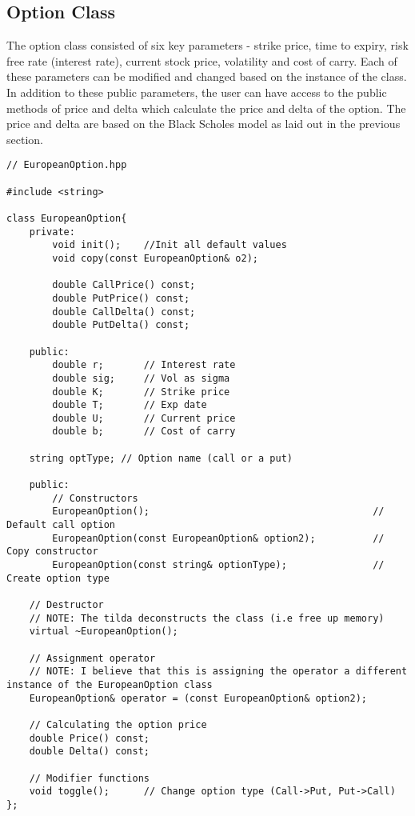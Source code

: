 \documentclass[12pt]{article}
\begin{document}
\subsection{Option Class}
The option class consisted of six key parameters - strike price, time to expiry, risk free rate (interest rate), current stock price, volatility and cost of carry. Each of these parameters can be modified and changed based on the instance of the class. In addition to these public parameters, the user can have access to the public methods of price and delta which calculate the price and delta of the option. The price and delta are based on the Black Scholes model as laid out in the previous section.
\begin{lstlisting}
// EuropeanOption.hpp

#include <string>

class EuropeanOption{
	private:
		void init();    //Init all default values
		void copy(const EuropeanOption& o2);
		
		double CallPrice() const;
		double PutPrice() const;
		double CallDelta() const;
		double PutDelta() const;
	
	public:
		double r;       // Interest rate
		double sig;     // Vol as sigma
		double K;       // Strike price
		double T;       // Exp date
		double U;       // Current price
		double b;       // Cost of carry
	
	string optType; // Option name (call or a put)
	
	public:
		// Constructors
		EuropeanOption();                                       // Default call option
		EuropeanOption(const EuropeanOption& option2);          // Copy constructor
		EuropeanOption(const string& optionType);               // Create option type
	
	// Destructor
	// NOTE: The tilda deconstructs the class (i.e free up memory)
	virtual ~EuropeanOption();
	
	// Assignment operator
	// NOTE: I believe that this is assigning the operator a different instance of the EuropeanOption class
	EuropeanOption& operator = (const EuropeanOption& option2);
	
	// Calculating the option price
	double Price() const;
	double Delta() const;
	
	// Modifier functions
	void toggle();      // Change option type (Call->Put, Put->Call)
};
\end{lstlisting}

\end{document}

